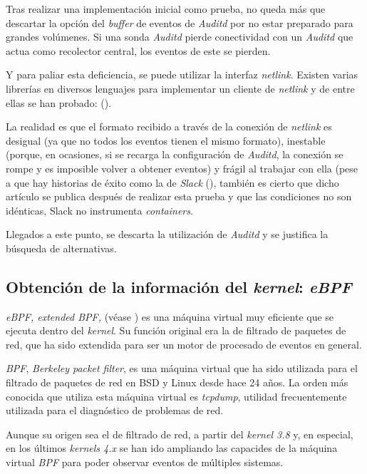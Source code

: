 Tras realizar una implementación inicial como prueba, no queda más que descartar la opción del \emph{buffer} de eventos de  \emph{Auditd} por no estar preparado para grandes volúmenes.
Si una sonda \emph{Auditd} pierde conectividad con un \emph{Auditd} que actua como recolector central, los eventos de este se pierden.

Y para paliar esta deficiencia, se puede utilizar la interfaz \emph{netlink}. Existen varias librerías en diversos lenguajes para implementar un cliente de \emph{netlink} y de entre ellas
se han probado: (\cite{netlink-glnpy,netlink-audit-go,netlink-go-audit}).

La realidad es que el formato recibido a través de la conexión de \emph{netlink} es desigual (ya que no todos los eventos tienen el mismo formato), inestable (porque, en ocasiones, si se recarga la configuración de \emph{Auditd}, la conexión se rompe y es imposible volver a obtener eventos) y frágil al trabajar con ella (pese a que hay historias de éxito
como la de \emph{Slack} (\cite{netlink-slack-success}), también es cierto que dicho artículo se publica después de realizar esta prueba y que las condiciones no son idénticas, Slack no instrumenta \emph{containers}.

Llegados a este punto, se descarta la utilización de \emph{Auditd} y se justifica la búsqueda de alternativas.

\subsection{Obtención de la información del \emph{kernel}: \emph{eBPF}}
\label{subsec:ebpf}

\emph{eBPF, extended BPF,} (véase \cite{ebpf-brendan-gregg,ebpf-series}) es una máquina virtual muy eficiente que se ejecuta dentro del \emph{kernel}. Su función original era la de filtrado de paquetes de red, que ha sido
extendida para ser un motor de procesado de eventos en general.

\emph{BPF}, \emph{Berkeley packet filter}, es una máquina virtual que ha sido utilizada para el filtrado de paquetes de red en BSD y Linux desde hace 24 años. La orden
más conocida que utiliza esta máquina virtual es \emph{tcpdump}, utilidad frecuentemente utilizada para el diagnóstico de problemas de red.

Aunque su origen sea el de filtrado de red, a partir del \emph{kernel 3.8} y, en especial, en los últimos \emph{kernels 4.x} se han ido ampliando las capacides de la máquina virtual \emph{BPF} para poder
observar eventos de múltiples sistemas.


